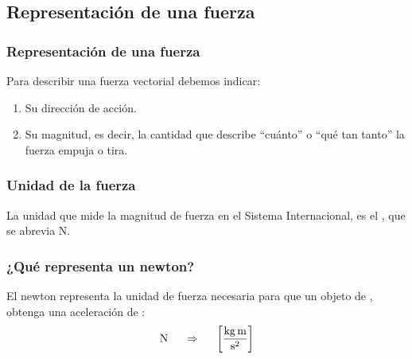\documentclass[14pt]{beamer}
\begin{document}
\subsection{Representación de una fuerza}

\begin{frame}
\frametitle{Representación de una fuerza}
Para describir una fuerza vectorial debemos indicar:
\begin{enumerate}[<+->]
\item Su dirección de acción.
\item Su magnitud, \pause es decir, la cantidad que describe \enquote{cuánto} o \enquote{qué tan tanto} la fuerza empuja o tira.
\end{enumerate}
\end{frame}
\begin{frame}
\frametitle{Unidad de la fuerza}
La unidad que mide la magnitud de fuerza en el Sistema Internacional, es el , que se abrevia \si{\newton}.
\end{frame}
\begin{frame}
\frametitle{¿Qué representa un newton?}
El newton representa la unidad de fuerza necesaria para que un objeto de , obtenga una aceleración de :
\pause
\begin{align*}
\si{\newton} \hspace{0.5cm} \Rightarrow \hspace{0.5cm} \left[ \si[per-mode=fraction]{\kilo\gram\meter\per\square\second} \right]
\end{align*}
\end{frame}

\end{document}
